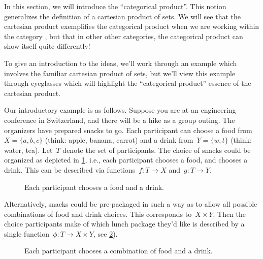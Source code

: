 In this section, we will introduce the ``categorical product''. This notion generalizes the definition of a cartesian product of sets. We will see that the cartesian product exemplifies the categorical product when we are working within the category \Set, but that in other other categories, the categorical product can show itself quite differently!

To give an introduction to the ideas, we'll work through an example which involves the familiar cartesian product of sets, but we'll view this example through eyeglasses which will highlight the ``categorical product'' essence of the cartesian product.

Our introductory example is as follows. Suppose you are at an engineering conference in Switzerland, and there will be a hike as a group outing. The organizers have prepared snacks to go. Each participant can choose a food from~$X=\{a,b,c\}$ (think: apple, banana, carrot) and a drink from~$Y=\{w,t\}$ (think: water, tea). Let~$T$ denote the set of participants. The choice of snacks could be organized as depicted in \cref{fig:snacks_1}, i.e., each participant chooses a food, and chooses a drink. This can be described via functions~$f\colon T \to X$ and~$g\colon  T \to Y$.

\begin{figure}[h!]
    \begin{center}
    \end{center}
    \caption{Each participant chooses a food and a drink. \label{fig:snacks_1}}
\end{figure}



Alternatively, snacks could be pre-packaged in such a way as to allow all possible combinations of food and drink choices. This corresponds to~$X\times Y$. Then the choice participants make of which lunch package they'd like is described by a single function~$\phi\colon T\to X\times Y$, see \cref{fig:snacks_2}).

\begin{figure}[h!]
    \begin{center}
    \end{center}
    \caption{Each participant chooses a combination of food and a drink. \label{fig:snacks_2}}
\end{figure}

